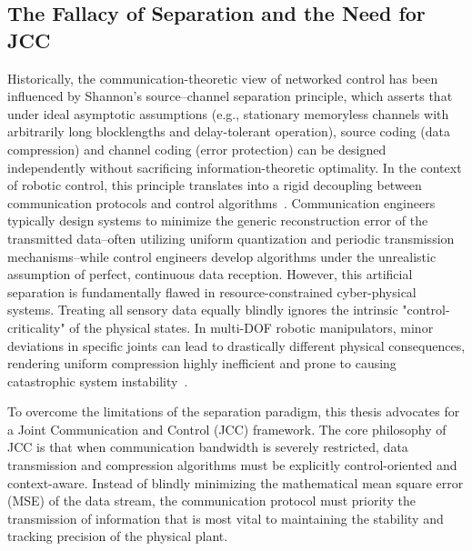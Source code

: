 \subsection{The Fallacy of Separation and the Need for JCC}
Historically, the communication-theoretic view of networked control has been influenced by Shannon’s source--channel separation principle, which asserts that under ideal asymptotic assumptions (e.g., stationary memoryless channels with arbitrarily long blocklengths and delay-tolerant operation), source coding (data compression) and channel coding (error protection) can be designed independently without sacrificing information-theoretic optimality. In the context of robotic control, 
this principle translates into a rigid decoupling between communication protocols and control algorithms~\cite{intro_cucc}. 
Communication engineers typically design systems to minimize the generic reconstruction error of the transmitted data--often utilizing uniform quantization and periodic transmission mechanisms--while control engineers develop algorithms under the unrealistic assumption of perfect, continuous data reception.
However, this artificial separation is fundamentally flawed in resource-constrained cyber-physical systems. Treating all sensory data equally blindly ignores the intrinsic "control-criticality" of the physical states.
In multi-DOF robotic manipulators, minor deviations in specific joints can lead to drastically different physical consequences, rendering uniform compression highly inefficient and prone to causing catastrophic system instability~\cite{intro_rct}.

To overcome the limitations of the separation paradigm, this thesis advocates for a Joint Communication and Control (JCC) framework.
The core philosophy of JCC is that when communication bandwidth is severely restricted, data transmission and compression algorithms 
must be explicitly control-oriented and context-aware. Instead of blindly minimizing the mathematical mean square error (MSE) of 
the data stream, the communication protocol must priority the transmission of information that is most vital to maintaining the stability 
and tracking precision of the physical plant.


